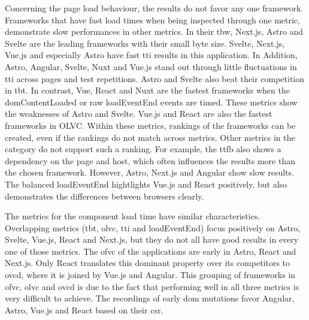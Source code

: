 \documentclass[a4paper, 12pt]{article}
\begin{document}
Concerning the page load behaviour, the results do not favor any one framework.
Frameworks that have fast load times when being inspected through one metric, demonstrate slow performances in other metrics.
In their \acrlong{tbw}, Next.js, Astro and Svelte are the leading frameworks with their small byte size.
Svelte, Next.js, Vue.js and especially Astro have fast \acrlong{tti} results in this application.
In Addition, Astro, Angular, Svelte, Nuxt and Vue.js stand out through little fluctuations in \acrshort{tti} across pages and test repetitions.
Astro and Svelte also beat their competition in \acrlong{tbt}.
In contrast, Vue, React and Nuxt are the fastest frameworks when the domContentLoaded or raw loadEventEnd events are timed.
These metrics show the weaknesses of Astro and Svelte.
Vue.js and React are also the fastest frameworks in OLVC.
Within these metrics, rankings of the frameworks can be created, even if the rankings do not match across metrics.
Other metrics in the category do not support such a ranking.
For example, the \acrlong{ttfb} also shows a dependency on the page and host, which often influences the results more than the chosen framework.
However, Astro, Next.js and Angular show slow results.
The balanced loadEventEnd hightlights Vue.js and React positively, but also demonstrates the differences between browsers clearly.

The metrics for the component load time have similar characteristics.
Overlapping metrics (\acrshort{tbt}, \acrshort{olvc}, \acrshort{tti} and loadEventEnd) focus positively on Astro, Svelte, Vue.js, React and Next.js, but they do not all have good results in every one of those metrics.
The \acrshort{ofvc} of the applications are early in Astro, React and Next.js.
Only React translates this dominant property over its competitors to \acrshort{ovcd}, where it is joined by Vue.js and Angular.
This grouping of frameworks in \acrshort{ofvc}, \acrshort{olvc} and \acrshort{ovcd} is due to the fact that performing well in all three metrics is very difficult to achieve.
The recordings of early \acrshort{dom} mutations favor Angular, Astro, Vue.js and React based on their \acrshort{csr}.
\end{document}
